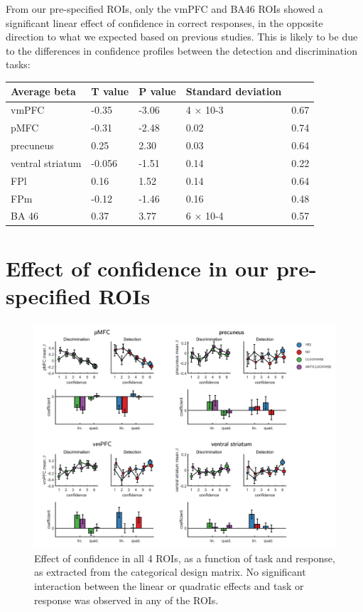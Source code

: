 \documentclass[12pt,twoside]{reedthesis}
\begin{document}
From our pre-specified ROIs, only the vmPFC and BA46 ROIs showed a significant linear effect of confidence in correct responses, in the opposite direction to what we expected based on previous studies. This is likely to be due to the differences in confidence profiles between the detection and discrimination tasks:
\begin{longtable}[]{@{}lllll@{}}
\toprule
Average beta & T value & P value & Standard deviation &\tabularnewline
\midrule
\endhead
vmPFC & -0.35 & -3.06 & 4 × 10-3 & 0.67\tabularnewline
pMFC & -0.31 & -2.48 & 0.02 & 0.74\tabularnewline
precuneus & 0.25 & 2.30 & 0.03 & 0.64\tabularnewline
ventral striatum & -0.056 & -1.51 & 0.14 & 0.22\tabularnewline
FPl & 0.16 & 1.52 & 0.14 & 0.64\tabularnewline
FPm & -0.12 & -1.46 & 0.16 & 0.48\tabularnewline
BA 46 & 0.37 & 3.77 & 6 × 10-4 & 0.57\tabularnewline
\bottomrule
\end{longtable}
\hypertarget{app3:ROIconf}{%
\section{Effect of confidence in our pre-specified ROIs}\label{app3:ROIconf}}
\begin{figure}
\includegraphics[width=\linewidth]{figure/ch3/allROIs} \caption[Effect of confidence in Regions of Interest]{Effect of confidence in all 4 ROIs, as a function of task and response, as extracted from the categorical design matrix. No significant interaction between the linear or quadratic effects and task or response was observed in any of the ROIs.}\label{fig:ROIconf}
\end{figure}
\end{document}
